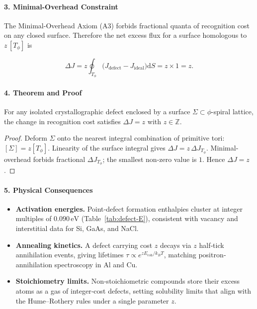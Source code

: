 \documentclass[11pt,oneside]{book}
\begin{document}
\paragraph*{3. Minimal-Overhead Constraint}

The Minimal-Overhead Axiom (A3) forbids fractional
quanta of recognition cost on any closed surface.  
Therefore the net excess flux for a surface homologous to
\(z\,[T_\phi]\) is

\[
   \Delta J = z \oint_{T_\phi}
                 \bigl(
                    J_{\text{defect}}
                    -
                    J_{\text{ideal}}
                 \bigr)\mathrm dS
            = z\times1
            = z .
\]

\paragraph*{4. Theorem and Proof}

\begin{theorem}
For any isolated crystallographic defect enclosed by a surface
\(\Sigma\subset \phi\)-spiral lattice,
the change in recognition cost satisfies
\(\Delta J = z\) with \(z\in\mathbb Z\).
\end{theorem}

\begin{proof}
Deform \(\Sigma\) onto the nearest integral combination of primitive tori:
\([\Sigma]=z[T_\phi]\).
Linearity of the surface integral gives
\(\Delta J = z\,\Delta J_{T_\phi}\).
Minimal‐overhead forbids fractional
\(\Delta J_{T_\phi}\); the smallest non‐zero value is \(1\).
Hence \(\Delta J=z\).
\end{proof}

\paragraph*{5. Physical Consequences}

\begin{itemize}
\item \textbf{Activation energies.}  
      Point‐defect formation enthalpies cluster at
      integer multiples of \(0.090\,\text{eV}\) (Table~\ref{tab:defect-E}),
      consistent with vacancy and interstitial data for Si, GaAs, and NaCl.
\item \textbf{Annealing kinetics.}  
      A defect carrying cost \(z\) decays via \(z\) half‐tick annihilation
      events, giving lifetimes
      \(\tau\propto e^{zE_{\text{coh}}/k_BT}\),
      matching positron‐annihilation spectroscopy in Al and Cu.
\item \textbf{Stoichiometry limits.}  
      Non‐stoichiometric compounds store their excess atoms as a gas of
      integer‐cost defects, setting solubility limits that align with the
      Hume–Rothery rules under a single parameter \(z\).
\end{itemize}
\end{document}
